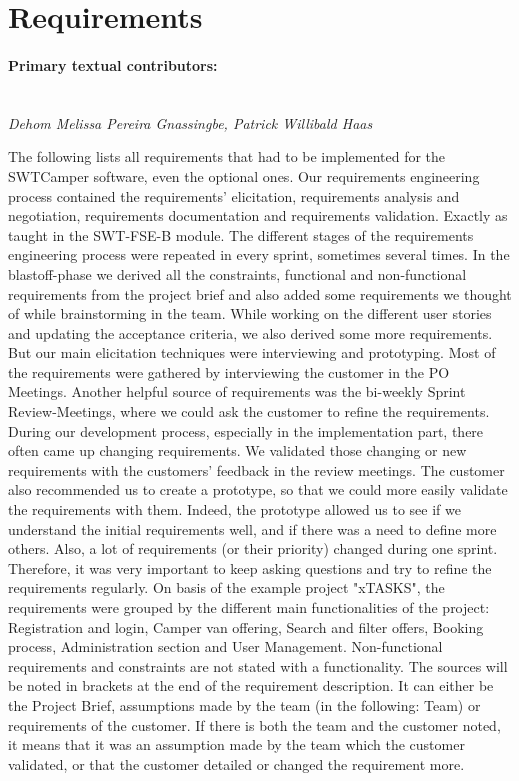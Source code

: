 \section{Requirements}
\label{sec:requirements}

\paragraph{Primary textual contributors:}
\mbox{}\\\emph{Dehom Melissa Pereira Gnassingbe, Patrick Willibald Haas}

The following lists all requirements that had to be implemented for the SWTCamper software, even the optional ones.
Our requirements engineering process contained the requirements' elicitation, requirements analysis and negotiation, requirements documentation and requirements validation.
Exactly as taught in the SWT-FSE-B module.
The different stages of the requirements engineering process were repeated in every sprint, sometimes several times.
In the blastoff-phase we derived all the constraints, functional and non-functional requirements from the project brief and also added some requirements we thought of while brainstorming in the team.
While working on the different user stories and updating the acceptance criteria, we also derived some more requirements.
But our main elicitation techniques were interviewing and prototyping.
Most of the requirements were gathered by interviewing the customer in the PO Meetings.
Another helpful source of requirements was the bi-weekly Sprint Review-Meetings, where we could ask the customer to refine the requirements.
During our development process, especially in the implementation part, there often came up changing requirements.
We validated those changing or new requirements with the customers' feedback in the review meetings.
The customer also recommended us to create a prototype, so that we could more easily validate the requirements with them.
Indeed, the prototype allowed us to see if we understand the initial requirements well, and if there was a need to define more others.
Also, a lot of requirements (or their priority) changed during one sprint.
Therefore, it was very important to keep asking questions and try to refine the requirements regularly.
On basis of the example project "xTASKS", the requirements were grouped by the different main functionalities of the project:
Registration and login, Camper van offering, Search and filter offers, Booking process, Administration section and User Management.
Non-functional requirements and constraints are not stated with a functionality.
The sources will be noted in brackets at the end of the requirement description.
It can either be the Project Brief, assumptions made by the team (in the following: Team) or requirements of the customer.
If there is both the team and the customer noted, it means that it was an assumption made by the team which the customer validated, or that the customer detailed or changed the requirement more.

